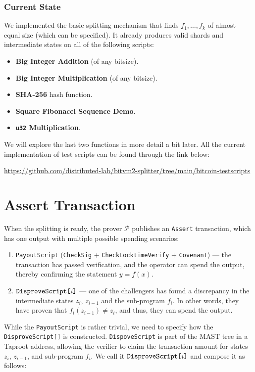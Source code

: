 \documentclass{iacrtrans}
\begin{document}
\subsubsection{Current State}
We implemented the basic splitting mechanism that finds $f_1,\dots,f_k$ of
almost equal size (which can be specified). It already produces valid shards and
intermediate states on all of the following scripts:
\begin{itemize}
    \item \textbf{Big Integer Addition} (of any bitsize).
    \item \textbf{Big Integer Multiplication} (of any bitsize).
    \item \textbf{SHA-256} hash function.
    \item \textbf{Square Fibonacci Sequence Demo}.
    \item \textbf{\texttt{u32} Multiplication}.
\end{itemize}

We will explore the last two functions in more detail a bit later. All the
current implementation of test scripts can be found through the link below:
\begin{center}
  \url{https://github.com/distributed-lab/bitvm2-splitter/tree/main/bitcoin-testscripts}
\end{center}


\section{Assert Transaction}\label{sec:assert-tx} When the splitting is ready,
the prover $\mathcal{P}$ publishes an \texttt{Assert} transaction, which has one
output with multiple possible spending scenarios:

\begin{enumerate}
  \item \texttt{PayoutScript} (\texttt{CheckSig} + \texttt{CheckLocktimeVerify} + \texttt{Covenant}) --- the transaction has passed verification, and the operator can spend the output, thereby confirming the statement $y=f(x)$.
  \item $\texttt{DisproveScript[\text{$i$}]}$ --- one of the challengers has found a discrepancy in the intermediate states \(z_i\), \(z_{i-1}\) and the sub-program \(f_i\). In other words, they have proven that \(f_i(z_{i-1}) \neq z_i\), and thus, they can spend the output.
\end{enumerate}

While the \texttt{PayoutScript} is rather trivial, we need to specify how the
\texttt{DisproveScript[]} is constructed. \texttt{DispoveScript} is
part of the MAST tree in a Taproot address, allowing the verifier to claim the
transaction amount for states \(z_i\), \(z_{i-1}\), and sub-program \(f_i\). We
call it \(\texttt{DisproveScript[\text{$i$}]}\) and compose it as follows:
\end{document}
